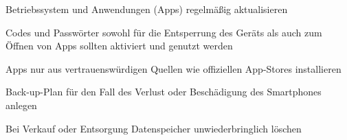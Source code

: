 \item Betriebssystem und Anwendungen (Apps) regelmäßig aktualisieren
\item Codes und Passwörter sowohl für die Entsperrung des Geräts als auch zum Öffnen von Apps sollten aktiviert und genutzt werden
\item Apps nur aus vertrauenswürdigen Quellen wie offiziellen App-Stores installieren
\item Back-up-Plan für den Fall des Verlust oder Beschädigung des Smartphones anlegen
\item Bei Verkauf oder Entsorgung Datenspeicher unwiederbringlich löschen 